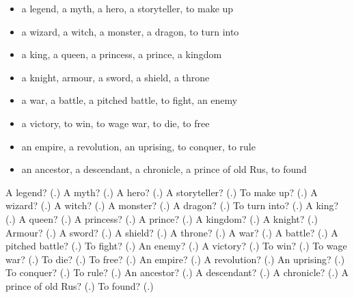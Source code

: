 \begin{itemize}
\raggedright
  \item a legend, a myth, a hero, a storyteller, to make up
  \item a wizard, a witch, a monster, a dragon, to turn into
  \item a king, a queen, a princess, a prince, a kingdom
  \item a knight, armour, a sword, a shield, a throne
  \item a war, a battle, a pitched battle, to fight, an enemy
  \item a victory, to win, to wage war, to die, to free
  \item an empire, a revolution, an uprising, to conquer, to rule
  \item an ancestor, a descendant, a chronicle, a prince of old Rus, to found
\end{itemize}

\begin{tcolorbox}[breakable,colback=teal!4,colframe=teal!35!black,title={Before you move on}]
A legend? (\textbf{}.) A myth? (\textbf{}.) A hero? (\textbf{}.) A storyteller? (\textbf{}.) To make up? (\textbf{}.) A wizard? (\textbf{}.) A witch? (\textbf{}.) A monster? (\textbf{}.) A dragon? (\textbf{}.) To turn into? (\textbf{}.) A king? (\textbf{}.) A queen? (\textbf{}.) A princess? (\textbf{}.) A prince? (\textbf{}.) A kingdom? (\textbf{}.) A knight? (\textbf{}.) Armour? (\textbf{}.) A sword? (\textbf{}.) A shield? (\textbf{}.) A throne? (\textbf{}.) A war? (\textbf{}.) A battle? (\textbf{}.) A pitched battle? (\textbf{}.) To fight? (\textbf{}.) An enemy? (\textbf{}.) A victory? (\textbf{}.) To win? (\textbf{}.) To wage war? (\textbf{}.) To die? (\textbf{}.) To free? (\textbf{}.) An empire? (\textbf{}.) A revolution? (\textbf{}.) An uprising? (\textbf{}.) To conquer? (\textbf{}.) To rule? (\textbf{}.) An ancestor? (\textbf{}.) A descendant? (\textbf{}.) A chronicle? (\textbf{}.) A prince of old Rus? (\textbf{}.) To found? (\textbf{}.)
\end{tcolorbox}
